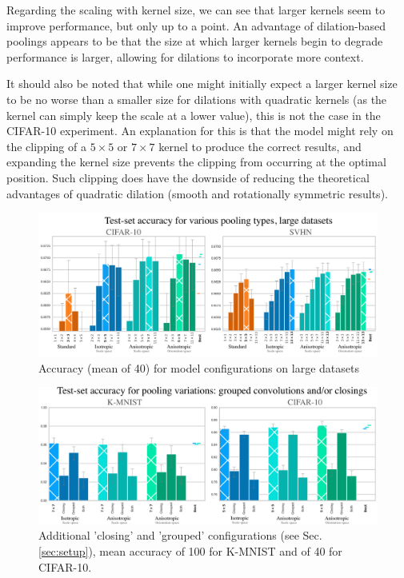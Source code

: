 \documentclass[a4paper, 12pt]{report}
\begin{document}
Regarding the scaling with kernel size, we can see that larger kernels seem to improve performance, but only up to a point. An advantage of dilation-based poolings appears to be that the size at which larger kernels begin to degrade performance is larger, allowing for dilations to incorporate more context.

It should also be noted that while one might initially expect a larger kernel size to be no worse than a smaller size for dilations with quadratic kernels (as the kernel can simply keep the scale at a lower value), this is not the case in the CIFAR-10 experiment. An explanation for this is that the model might rely on the clipping of a $5\times5$ or $7\times7$ kernel to produce the correct results, and expanding the kernel size prevents the clipping from occurring at the optimal position. Such clipping does have the downside of reducing the theoretical advantages of quadratic dilation (smooth and rotationally symmetric results).


\begin{figure}[hb!]
	\center
  \includegraphics[width=1\textwidth]{figures/results-large.png}
  \caption{Accuracy (mean of 40) for model configurations on large datasets}
  \label{fig:res-large}
\end{figure}
\newpage
\begin{figure}[ht!]
	\center
  \includegraphics[width=1\textwidth]{figures/results-alt}
  \caption{Additional 'closing' and 'grouped' configurations (see Sec. \ref{sec:setup}), mean accuracy of 100 for K-MNIST and of 40 for CIFAR-10.}
  \label{fig:res-alt}
\end{figure}
\vspace{-0.4cm}
\end{document}
